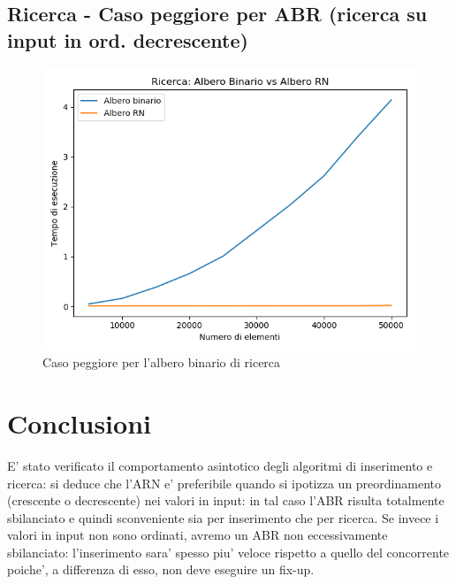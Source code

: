 \documentclass[a4paper]{article}
\begin{document}
\subsection{Ricerca - Caso peggiore per ABR (ricerca su input in ord. decrescente)}		

		\begin{figure}[!htb]
		\centering
		\includegraphics[scale=0.3]{casopeggioreABR}
		\caption{Caso peggiore per l'albero binario di ricerca}
		\label{fig:RicercaPeggioreAbr}
		\end{figure}
		

\section{Conclusioni}
E' stato verificato il comportamento asintotico degli algoritmi di inserimento e ricerca: si deduce che l'ARN e' preferibile quando si ipotizza un preordinamento (crescente o decrescente) nei valori in input: in tal caso l'ABR risulta totalmente sbilanciato e quindi sconveniente sia per inserimento che per ricerca. Se invece i valori in input non sono ordinati, avremo un ABR non eccessivamente sbilanciato: l'inserimento sara' spesso piu' veloce rispetto a quello del concorrente poiche', a differenza di esso, non deve eseguire un fix-up.
\end{document}
